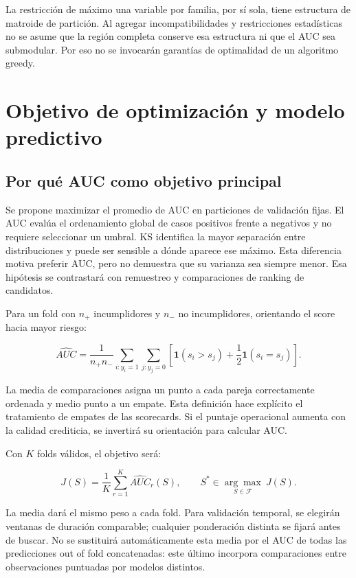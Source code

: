 \documentclass[11pt,letterpaper]{article}
\begin{document}
La restricción de máximo una variable por familia, por sí sola, tiene estructura de matroide de partición. Al agregar incompatibilidades y restricciones estadísticas no se asume que la región completa conserve esa estructura ni que el AUC sea submodular. Por eso no se invocarán garantías de optimalidad de un algoritmo greedy.

\section{Objetivo de optimización y modelo predictivo}\label{sec:4}

\subsection{Por qué AUC como objetivo principal}\label{sec:4.1}

Se propone maximizar el promedio de AUC en particiones de validación fijas. El AUC evalúa el ordenamiento global de casos positivos frente a negativos y no requiere seleccionar un umbral. KS identifica la mayor separación entre distribuciones y puede ser sensible a dónde aparece ese máximo. Esta diferencia motiva preferir AUC, pero no demuestra que su varianza sea siempre menor. Esa hipótesis se contrastará con remuestreo y comparaciones de ranking de candidatos.

Para un fold con \(n_+\) incumplidores y \(n_-\) no incumplidores, orientando el score hacia mayor riesgo:

\[
\widehat{AUC}=\frac{1}{n_+n_-}\sum_{i:y_i=1}\sum_{j:y_j=0}
\left[\mathbf{1}(s_i>s_j)+\frac{1}{2}\mathbf{1}(s_i=s_j)\right].
\]

La media de comparaciones asigna un punto a cada pareja correctamente ordenada y medio punto a un empate. Esta definición hace explícito el tratamiento de empates de las scorecards. Si el puntaje operacional aumenta con la calidad crediticia, se invertirá su orientación para calcular AUC.

Con \(K\) folds válidos, el objetivo será:

\[
J(S)=\frac{1}{K}\sum_{r=1}^{K}\widehat{AUC}_r(S),\qquad
S^*\in\underset{S\in\mathcal{F}}{\arg\max}\ J(S).
\]

La media dará el mismo peso a cada fold. Para validación temporal, se elegirán ventanas de duración comparable; cualquier ponderación distinta se fijará antes de buscar. No se sustituirá automáticamente esta media por el AUC de todas las predicciones out of fold concatenadas: este último incorpora comparaciones entre observaciones puntuadas por modelos distintos.
\end{document}

